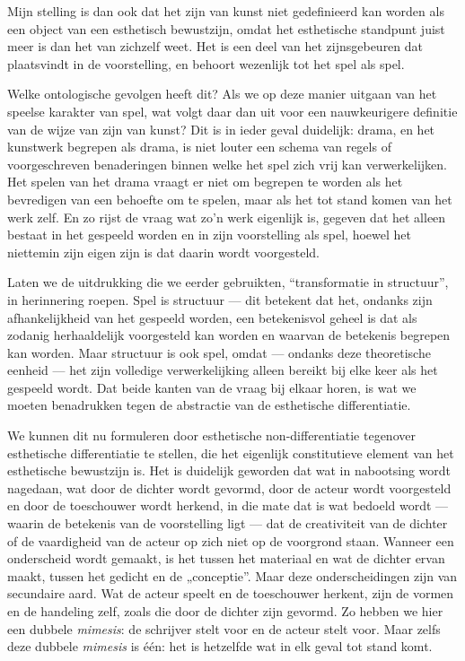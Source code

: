 Mijn stelling is dan ook dat het zijn van kunst niet gedefinieerd kan worden als een object van een esthetisch bewustzijn, omdat het esthetische standpunt juist meer is dan het van zichzelf weet. Het is een deel van het zijnsgebeuren dat plaatsvindt in de voorstelling, en behoort wezenlijk tot het spel als spel.

Welke ontologische gevolgen heeft dit? Als we op deze manier uitgaan van het speelse karakter van spel, wat volgt daar dan uit voor een nauwkeurigere definitie van de wijze van zijn van kunst? Dit is in ieder geval duidelijk: drama, en het kunstwerk begrepen als drama, is niet louter een schema van regels of voorgeschreven benaderingen binnen welke het spel zich vrij kan verwerkelijken. Het spelen van het drama vraagt er niet om begrepen te worden als het bevredigen van een behoefte om te spelen, maar als het tot stand komen van het werk zelf. En zo rijst de vraag wat zo’n werk eigenlijk is, gegeven dat het alleen bestaat in het gespeeld worden en in zijn voorstelling als spel, hoewel het niettemin zijn eigen zijn is dat daarin wordt voorgesteld.

Laten we de uitdrukking die we eerder gebruikten, ``transformatie in structuur'', in herinnering roepen. Spel is structuur — dit betekent dat het, ondanks zijn afhankelijkheid van het gespeeld worden, een betekenisvol geheel is dat als zodanig herhaaldelijk voorgesteld kan worden en waarvan de betekenis begrepen kan worden. Maar structuur is ook spel, omdat — ondanks deze theoretische eenheid — het zijn volledige verwerkelijking alleen bereikt bij elke keer als het gespeeld wordt. Dat beide kanten van de vraag bij elkaar horen, is wat we moeten benadrukken tegen de abstractie van de esthetische differentiatie.

We kunnen dit nu formuleren door esthetische non-differentiatie tegenover esthetische differentiatie te stellen, die het eigenlijk constitutieve element van het esthetische bewustzijn is. Het is duidelijk geworden dat wat in nabootsing wordt nagedaan, wat door de dichter wordt gevormd, door de acteur wordt voorgesteld en door de toeschouwer wordt herkend, in die mate dat is wat bedoeld wordt — waarin de betekenis van de voorstelling ligt — dat de creativiteit van de dichter of de vaardigheid van de acteur op zich niet op de voorgrond staan. Wanneer een onderscheid wordt gemaakt, is het tussen het materiaal en wat de dichter ervan maakt, tussen het gedicht en de „conceptie”. Maar deze onderscheidingen zijn van secundaire aard. Wat de acteur speelt en de toeschouwer herkent, zijn de vormen en de handeling zelf, zoals die door de dichter zijn gevormd. Zo hebben we hier een dubbele \textit{mimesis}: de schrijver stelt voor en de acteur stelt voor. Maar zelfs deze dubbele \textit{mimesis} is één: het is hetzelfde wat in elk geval tot stand komt.

